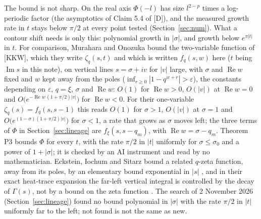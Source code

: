 \documentclass[11pt]{article}
\newcommand{\re}{\operatorname{Re}}
\newcommand{\im}{\operatorname{Im}}
\begin{document}
The bound is not sharp. On the real axis $\Phi(-l)$ has size $l^{2-p}$ times a log-periodic factor (the asymptotics of Claim 5.4 of [D]), and the measured growth rate in $t$ stays below $\pi/2$ at every point tested (Section~\ref{sec:num}). What a contour shift needs is only this: polynomial growth in $|\sigma|$, and growth below $e^{\pi|t|}$ in $t$. For comparison, Murahara and Onozuka \cite[Theorem~1.1 and Corollary~1.2]{MO} bound the two-variable function of [KKW], which they write $\zeta_q(s,t)$ and which is written $f_q(s,w)$ here ($t$ being $\im s$ in this note), on vertical lines $s=\sigma+iv$ for $|v|$ large, with $\sigma$ and $\re w$ fixed and $w$ kept away from the poles ($\inf_{r\ge0}|1-q^{w+r}|>\varepsilon$), the constants depending on $\varepsilon$, $q=\xi$, $\sigma$ and $\re w$: $O(1)$ for $\re w>0$, $O(|v|)$ at $\re w=0$ and $O\bigl(e^{-\re w\,(1+\pi/2)|v|}\bigr)$ for $\re w<0$. For their one-variable $\zeta_q(s)=f_q(s,s-1)$ this reads $O(1)$ for $\sigma>1$, $O(|v|)$ at $\sigma=1$ and $O\bigl(e^{(1-\sigma)(1+\pi/2)|v|}\bigr)$ for $\sigma<1$, a rate that grows as $\sigma$ moves left; the three terms of $\Phi$ in Section~\ref{sec:lineage} are $f_\xi(s,s-q_m)$, with $\re w=\sigma-q_m$. Theorem P3 bounds $\Phi$ for every $t$, with the rate $\pi/2$ in $|t|$ uniformly for $\sigma\le\sigma_0$ and a power of $1+|\sigma|$; it is checked by an AI instrument and read by no mathematician. Eckstein, Iochum and Sitarz bound a related $q$-zeta function, away from its poles, by an elementary bound exponential in $|s|$ \cite[eq.~(19), page~6]{EIS}, and in their exact heat-trace expansion the far-left vertical integral is controlled by the decay of $\Gamma(s)$, not by a bound on the zeta function \cite[Proposition~4.3]{EIS}. The search of 2 November 2026 (Section~\ref{sec:lineage}) found no bound polynomial in $|\sigma|$ with the rate $\pi/2$ in $|t|$ uniformly far to the left; not found is not the same as new.
\end{document}

